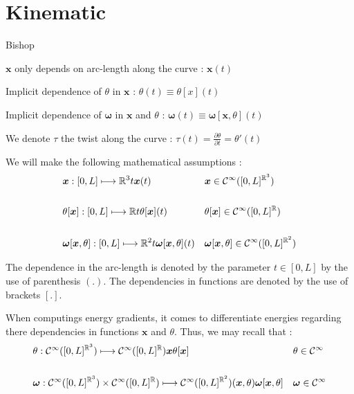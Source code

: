 \section{Kinematic}

Bishop

 $\boldsymbol{x}$ only depends on arc-length along the curve : $\boldsymbol{x}(t)$

Implicit dependence of $\theta$ in $\boldsymbol{x}$ : $\theta(t) \equiv \theta[x](t)$

Implicit dependence of $\boldsymbol{\omega}$ in $\boldsymbol{x}$ and $\theta$ : $\boldsymbol{\omega}(t) \equiv \boldsymbol{\omega}[\boldsymbol{x},\theta](t)$

We denote $\tau$ the twist along the curve : $\tau(t) = \frac{\partial \theta}{\partial t} = \theta'(t)$

We will make the following mathematical assumptions :
\begin{align}
	&\boldsymbol{x} : [0,L] \longmapsto \mathbb{R}^3{t}{\boldsymbol{x}(t)}
	&&\boldsymbol{x} \in \mathcal{C}^{\infty}([0,L]^{\mathbb{R}^3})
	\\ \notag\\
	&\theta[\boldsymbol{x}] : [0,L] \longmapsto \mathbb{R}{t}{\theta[\boldsymbol{x}](t)}
	&&\theta[\boldsymbol{x}] \in \mathcal{C}^{\infty}([0,L]^{\mathbb{R}})
	\\ \notag\\
	&\boldsymbol{\omega}[\boldsymbol{x},\theta] : [0,L] \longmapsto \mathbb{R}^2{t}{\boldsymbol{\omega}[\boldsymbol{x},\theta](t)}
	&&\boldsymbol{\omega}[\boldsymbol{x},\theta] \in \mathcal{C}^{\infty}([0,L]^{\mathbb{R}^2})
\end{align}

The dependence in the arc-length is denoted by the parameter $t \in [0,L]$ by the use of parenthesis $(.)$.
The dependencies in functions are denoted by the use of brackets $[.]$.

When computings energy gradients, it comes to differentiate energies regarding there dependencies in functions $\boldsymbol{x}$ and $\theta$. Thus, we may recall that :
\begin{align}
	&\theta : \mathcal{C}^{\infty}([0,L]^{\mathbb{R}^3}) \longmapsto \mathcal{C}^{\infty}([0,L]^\mathbb{R}){\boldsymbol{x}}{\theta[\boldsymbol{x}]}
	&&\theta \in \mathcal{C}^{\infty}
	\\ \notag\\
	&\boldsymbol{\omega} : \mathcal{C}^{\infty}([0,L]^{\mathbb{R}^3}) \times \mathcal{C}^{\infty}([0,L]^{\mathbb{R}}) \longmapsto \mathcal{C}^{\infty}([0,L]^{\mathbb{R}^2}){(\boldsymbol{x},\theta)}{\boldsymbol{\omega}[\boldsymbol{x},\theta]}
	&&\boldsymbol{\omega} \in \mathcal{C}^{\infty}
\end{align}





